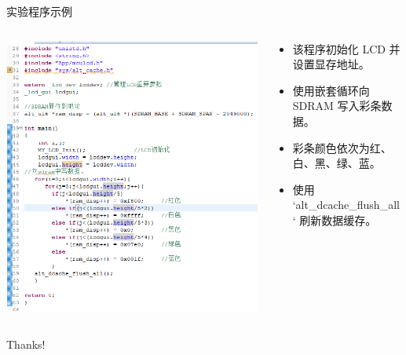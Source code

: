 \documentclass{beamer}
\begin{document}
\begin{frame}{实验程序示例}
    \begin{columns}
        \begin{column}{0.5\textwidth}
            \centering
            \includegraphics[width=1\textwidth]{pic/003.png}
            \label{fig:system_block_diagram}
        \end{column}
        
        \begin{column}{0.5\textwidth}
            \begin{itemize}
                \item 该程序初始化 LCD 并设置显存地址。
                \item 使用嵌套循环向 SDRAM 写入彩条数据。
                \item 彩条颜色依次为红、白、黑、绿、蓝。
                \item 使用 `alt\_dcache\_flush\_all` 刷新数据缓存。
            \end{itemize}
        \end{column}
    \end{columns}
\end{frame}




\begin{frame}
	\begin{center}
		{\Huge\calligra Thanks!}
	\end{center}
\end{frame}
	
	
\end{document}
